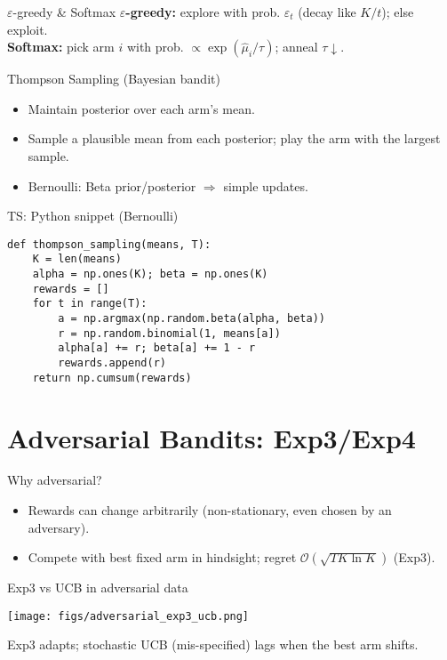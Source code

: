 \documentclass[aspectratio=169]{beamer}
\newcommand{\cO}{\mathcal{O}}
\begin{document}
\begin{frame}{$\varepsilon$-greedy \& Softmax}
\small
\textbf{$\varepsilon$-greedy:} explore with prob. $\varepsilon_t$ (decay like $K/t$); else exploit.\\
\textbf{Softmax:} pick arm $i$ with prob. $\propto \exp(\hat{\mu}_i/\tau)$; anneal $\tau\downarrow$.
\end{frame}

\begin{frame}{Thompson Sampling (Bayesian bandit)}
\small
\begin{itemize}
  \item Maintain posterior over each arm’s mean.
  \item Sample a plausible mean from each posterior; play the arm with the largest sample.
  \item Bernoulli: Beta prior/posterior $\Rightarrow$ simple updates.
\end{itemize}
\end{frame}

\begin{frame}[fragile]{TS: Python snippet (Bernoulli)}
\small
\begin{verbatim}
def thompson_sampling(means, T):
    K = len(means)
    alpha = np.ones(K); beta = np.ones(K)
    rewards = []
    for t in range(T):
        a = np.argmax(np.random.beta(alpha, beta))
        r = np.random.binomial(1, means[a])
        alpha[a] += r; beta[a] += 1 - r
        rewards.append(r)
    return np.cumsum(rewards)
\end{verbatim}
\end{frame}

\section{Adversarial Bandits: Exp3/Exp4}

\begin{frame}{Why adversarial?}
\small
\begin{itemize}
  \item Rewards can change arbitrarily (non-stationary, even chosen by an adversary).
  \item Compete with best fixed arm in hindsight; regret $\cO(\sqrt{TK\ln K})$ (Exp3).
\end{itemize}
\end{frame}

\begin{frame}{Exp3 vs UCB in adversarial data}
\begin{center}
\texttt{[image: figs/adversarial\_exp3\_ucb.png]}
\end{center}
\small Exp3 adapts; stochastic UCB (mis-specified) lags when the best arm shifts.
\end{frame}
\end{document}
